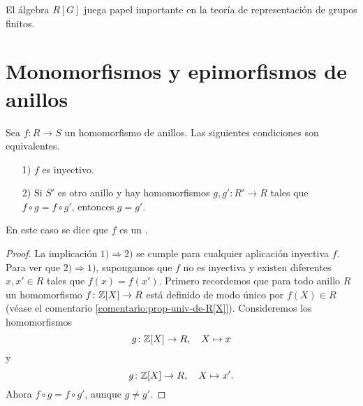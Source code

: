 El álgebra $R [G]$ juega papel importante en la teoría de representación
de grupos finitos.


\section{Monomorfismos y epimorfismos de anillos}

\begin{proposicion}
  Sea $f\colon R\to S$ un homomorfismo de anillos. Las siguientes condiciones
  son equivalentes.

  \begin{enumerate}
  \item[1)] $f$ es inyectivo.

  \item[2)] Si $S'$ es otro anillo y hay homomorfismos $g, g'\colon R'\to R$
    tales que $f\circ g = f\circ g'$, entonces $g = g'$.
  \end{enumerate}

  En este caso se dice que $f$ es un
  .

  \begin{proof}
    La implicación $1) \Rightarrow 2)$ se cumple para cualquier aplicación
    inyectiva $f$. Para ver que $2) \Rightarrow 1)$, supongamos que $f$
    no es inyectiva y existen diferentes $x,x'\in R$ tales que
    $f (x) = f (x')$. Primero recordemos que para todo anillo $R$
    un homomorfismo $f\colon \mathbb{Z} [X] \to R$ está definido de modo único
    por $f (X) \in R$ (véase el comentario
    \ref{comentario:prop-univ-de-R[X]}). Consideremos los homomorfismos
    $$g\colon \mathbb{Z} [X] \to R, \quad X \mapsto x$$
    y
    $$g\colon \mathbb{Z} [X] \to R, \quad X \mapsto x'.$$
    Ahora $f\circ g = f\circ g'$, aunque $g\ne g'$.
  \end{proof}
\end{proposicion}

